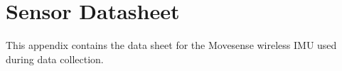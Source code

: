 \chapter{Sensor Datasheet}
\label{chp:sensor-datasheet}
This appendix contains the data sheet for the Movesense wireless IMU used during data collection\cite{MovesenseSpec}.

